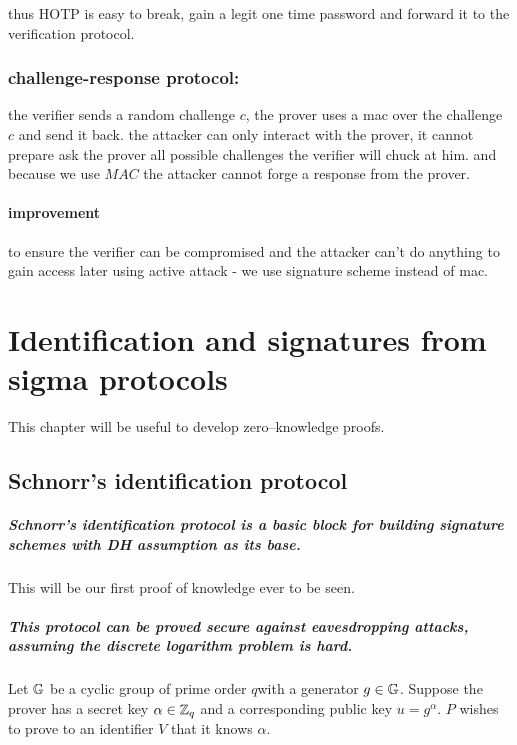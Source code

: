 thus HOTP is easy to break, gain a legit one time password and forward
it to the verification protocol. 

\subsection{challenge-response protocol: }

the verifier sends a random challenge $c$, the prover uses a mac
over the challenge $c$ and send it back. the attacker can only interact
with the prover, it cannot prepare ask the prover all possible challenges
the verifier will chuck at him. and because we use $MAC$ the attacker
cannot forge a response from the prover. 

\subsubsection{improvement }

to ensure the verifier can be compromised and the attacker can't do
anything to gain access later using active attack - we use signature
scheme instead of mac. 

\chapter{Identification and signatures from sigma protocols}

This chapter will be useful to develop zero--knowledge proofs.

\section{Schnorr\textquoteright s identification protocol }

\paragraph{Schnorr's identification protocol is a basic block for building signature
schemes with DH assumption as its base.}

This will be our first proof of knowledge ever to be seen.

\paragraph{This protocol can be proved secure against eavesdropping attacks,
assuming the discrete logarithm problem is hard.}

Let $\mathbb{G}$ be a cyclic group of prime order $q$with a generator $g\in\mathbb{G}$.
Suppose the prover has a secret key $\alpha\in\mathbb{Z}_{q}$ and a corresponding
public key $u=g^{\alpha}$. $P$ wishes to prove to an identifier
$V$ that it knows $\alpha$.

